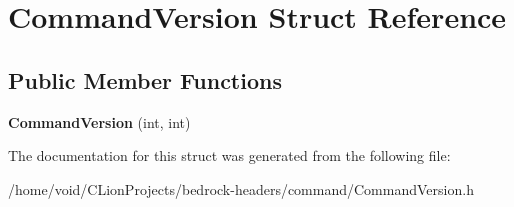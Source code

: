 \hypertarget{struct_command_version}{}\section{Command\+Version Struct Reference}
\label{struct_command_version}
\subsection*{Public Member Functions}
\begin{DoxyCompactItemize}
\item 
\mbox{\label{struct_command_version_a453868821eaa2887c8f8e549455c6c43}} 
{\bfseries Command\+Version} (int, int)
\end{DoxyCompactItemize}


The documentation for this struct was generated from the following file\+:\begin{DoxyCompactItemize}
\item 
/home/void/\+C\+Lion\+Projects/bedrock-\/headers/command/Command\+Version.\+h\end{DoxyCompactItemize}
